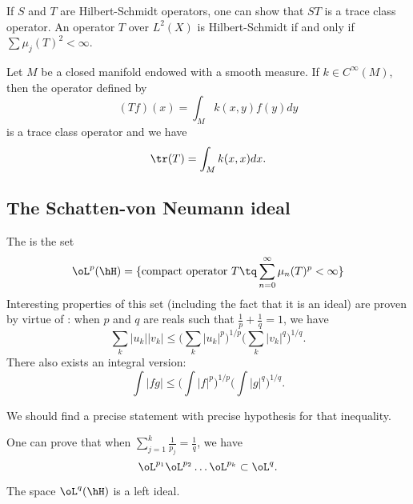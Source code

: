 If $S$ and $T$ are Hilbert-Schmidt operators, one can show that $ST$ is a trace class operator. An operator $T$ over $L^2(X)$ is Hilbert-Schmidt if and only if $\sum\mu_j(T)^2<\infty$.

\begin{lemma}
Let $M$ be a closed manifold endowed with a smooth measure. If $k\in C^{\infty}(M)$, then the operator defined by
\[
  (Tf)(x)=\int_Mk(x,y)f(y)dy
\]
is a trace class operator and we have
\begin{equation}
\tr(T)=\int_Mk(x,x)dx.
\end{equation}

\end{lemma}


\subsection{The Schatten-von Neumann ideal}

The  is the set
\[
  \oL^p(\hH)=\{ \textrm{compact operator } T\tq \sum_{n=0}^{\infty}\mu_n(T)^p<\infty \}
\]
Interesting properties of this set (including the fact that it is an ideal) are proven by virtue of : when $p$ and $q$ are reals such that $\frac{1}{ p }+\frac{1}{ q }=1$, we have
\begin{equation}
\sum_{k}| u_k | |v_k |\leq \Big( \sum_{k}| u_k |^p \Big)^{1/p}\Big( \sum_{k}| v_k |^{q} \Big)^{1/q}.
\end{equation}
There also exists an integral version:
\begin{equation}
\int | fg |\leq \Big( \int | f |^p \Big)^{1/p}\Big( \int| g |^q \Big)^{1/q}.
\end{equation}

\begin{probleme}
	We should find a precise statement with precise hypothesis for that inequality.
\end{probleme}

One can prove that when $\sum_{j=1}^{k}\frac{1}{ p_j }=\frac{1}{ q }$, we have
\begin{equation}    \label{EqPropLLLsvn}
\oL^{p_1}\oL^{p_2}\ldots\oL^{p_k}\subset \oL^q.
\end{equation}

\begin{lemma}
The space $\oL^q(\hH)$ is a left ideal.
\end{lemma}

